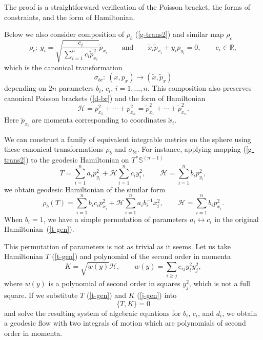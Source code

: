 \documentclass[pdftex]{sigma}
\numberwithin{equation}{section}
\begin{document}
The proof is a straightforward verification of the Poisson bracket, the forms of constraints, and the form of Hamiltonian.

Below we also consider composition of $\rho_b$ (\ref{g-trans2}) and similar map $\rho_c$
\[
\rho_c\colon \  y_i= \sqrt{\frac{c_i}{\sum_{i=1}^n c_i\tilde{p}_{x_i}^2}} \tilde{p}_{x_i}\qquad\text{and}\qquad \tilde{x}_i\tilde{p}_{x_i}+y_ip_{y_i}=0 ,\qquad c_i\in \mathbb R ,
\]
which is the canonical transformation
\begin{equation}\label{bc-trans}
\sigma_{bc}\colon \ (x,p_{x})\to (\tilde{x},\tilde{p}_x)
\end{equation}
depending on $2n$ parameters $b_{i}$, $c_{i}$, $i=1,\dots,n$. This composition also preserves canonical Poisson brackets (\ref{d-br}) and the form of Hamiltonian
\[
\mathcal H=p_{x_1}^2+\cdots +p_{x_n}^2=\tilde{p}_{x_1}^2+\cdots+ \tilde{p}_{x_n}^2 .
\]
Here $\tilde{p}_{x_i}$ are momenta corresponding to coordinates $\tilde{x}_i$.

We can construct a family of equivalent integrable metrics on the sphere using these canonical transformations $\rho_b$ and $\sigma_{bc}$. For instance, applying mapping (\ref{g-trans2}) to the geodesic Hamiltonian on $T^*\mathbb S^{(n-1)}$
\begin{equation}\label{t-gen}
T=\sum_{i=1}^n a_i p_{y_i}^2+\mathcal H\sum_{i=1}^n c_iy_i^2 ,\qquad \mathcal H=\sum_{i=1}^n b_ip_{y_i}^2 ,
\end{equation}
we obtain geodesic Hamiltonian of the similar form
\begin{equation}\label{t-gen2}
\rho_b(T)=\sum_{i=1}^n b_ic_i p_{x_i}^2+\mathcal H\sum_{i=1}^n a_ib_i^{-1}x_i^2 ,\qquad \mathcal H=\sum_{i=1}^n b_ip_{x_i}^2.
\end{equation}
When $b_i=1$, we have a simple permutation of parameters $a_i\leftrightarrow c_i$ in the original Hamiltonian~(\ref{t-gen}).

This permutation of parameters is not as trivial as it seems. Let us take Hamiltonian $T$ (\ref{t-gen}) and polynomial of the second order in momenta
\begin{equation}\label{j-gen}
K=\sqrt{ w(y) } \mathcal H ,\qquad w(y)=\sum_{i\geq j} e_{ij} y_i^2y_j^2 ,
\end{equation}
where $w(y)$ is a polynomial of second order in squares $y_j^2$, which is not a full square. If we substitute $T$ (\ref{t-gen}) and $K$ (\ref{j-gen}) into
\[
\{T,K\}=0
\]
and solve the resulting system of algebraic equations for $b_i$, $c_i$, and $d_i$, we obtain a geodesic flow with two integrals of motion which are polynomials of second order in momenta.
\end{document}
